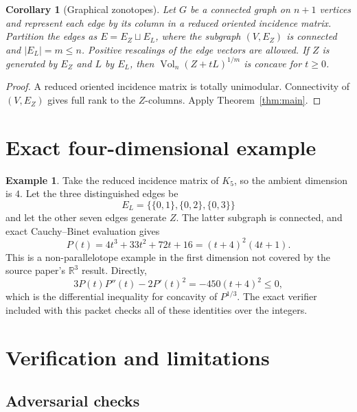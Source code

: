 \documentclass[11pt]{article}
\newtheorem{corollary}[theorem]{Corollary}
\theoremstyle{definition}
\newtheorem{example}[theorem]{Example}
\newcommand{\Vol}{\operatorname{Vol}}
\newcommand{\R}{\mathbb{R}}
\begin{document}
\begin{corollary}[Graphical zonotopes]\label{cor:graphical}
Let \(G\) be a connected graph on \(n+1\) vertices and represent each edge by
its column in a reduced oriented incidence matrix.  Partition the edges as
\(E=E_Z\sqcup E_L\), where the subgraph \((V,E_Z)\) is connected and
\(|E_L|=m\leq n\).  Positive rescalings of the edge vectors are allowed.
If \(Z\) is generated by \(E_Z\) and \(L\) by \(E_L\), then
\(\Vol_n(Z+tL)^{1/m}\) is concave for \(t\geq0\).
\end{corollary}

\begin{proof}
A reduced oriented incidence matrix is totally unimodular.  Connectivity of
\((V,E_Z)\) gives full rank to the \(Z\)-columns.  Apply
Theorem~\ref{thm:main}.
\end{proof}

\section{Exact four-dimensional example}

\begin{example}
Take the reduced incidence matrix of \(K_5\), so the ambient dimension is
\(4\).  Let the three distinguished edges be
\[
E_L=\{\{0,1\},\{0,2\},\{0,3\}\}
\]
and let the other seven edges generate \(Z\).  The latter subgraph is
connected, and exact Cauchy--Binet evaluation gives
\[
P(t)=4t^3+33t^2+72t+16=(t+4)^2(4t+1).
\]
This is a non-parallelotope example in the first dimension not covered by the
source paper's \(\R^3\) result.  Directly,
\[
3P(t)P''(t)-2P'(t)^2=-450(t+4)^2\leq0,
\]
which is the differential inequality for concavity of \(P^{1/3}\).
The exact verifier included with this packet checks all of these identities
over the integers.
\end{example}

\section{Verification and limitations}

\subsection*{Adversarial checks}
\end{document}
